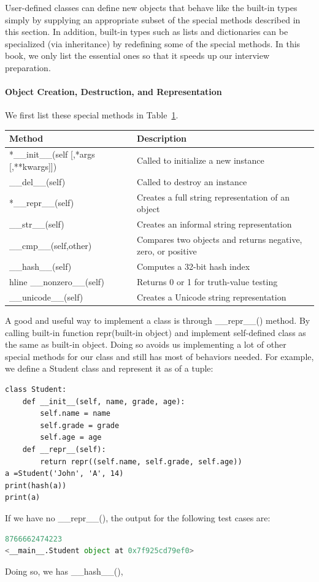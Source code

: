 \documentclass[../main.tex]{subfiles}
\begin{document}
User-defined classes can define new objects that behave like the built-in types simply by supplying an appropriate subset of the special methods described in this section. In addition, built-in types such as lists and dictionaries can be specialized (via inheritance) by redefining some of the special methods. In this book, we only list the essential ones so that it speeds up our interview preparation. 
\paragraph{Object Creation, Destruction, and Representation} We first list these special methods in Table~\ref{tab:special_methods_for_object_creation}.
\begin{table}[h]
\begin{small}
\centering
\noindent{}
 \noindent \begin{tabular}{|p{}|p{}|}
  \hline
Method& Description \\ \hline
*\_\_init\_\_(self [,*args [,**kwargs]]) &	Called to initialize a new instance\\ \hline
\_\_del\_\_(self) 	& Called to destroy an instance \\ \hline
*\_\_repr\_\_(self) & Creates a full string representation of an object \\ \hline
\_\_str\_\_(self) & Creates an informal string representation \\\hline
\_\_cmp\_\_(self,other) & Compares two objects and returns negative, zero, or positive \\\hline
\_\_hash\_\_(self) & Computes a 32-bit hash index \\hline
\_\_nonzero\_\_(self) & Returns 0 or 1 for truth-value testing \\\hline
\_\_unicode\_\_(self) & Creates a Unicode string representation \\\hline
\end{tabular}
  \label{tab:special_methods_for_object_creation}
  \end{small}
\end{table} 
A good and useful way to implement a class is through \_\_repr\_\_() method. By calling built-in function repr(built-in object) and implement self-defined class as the same as built-in object. Doing so avoids us implementing a lot of other special methods for our class and still has most of behaviors needed. For example, we define a Student class and represent it as of a tuple:
\begin{lstlisting}
class Student:
    def __init__(self, name, grade, age):
        self.name = name
        self.grade = grade
        self.age = age
    def __repr__(self):
        return repr((self.name, self.grade, self.age))
a =Student('John', 'A', 14)
print(hash(a))
print(a)
\end{lstlisting}
If we have no \_\_repr\_\_(), the output for the following test cases are:
\begin{lstlisting}[language=Python]
8766662474223
<__main__.Student object at 0x7f925cd79ef0>
\end{lstlisting}
Doing so, we has \_\_hash\_\_(), 
\end{document}
